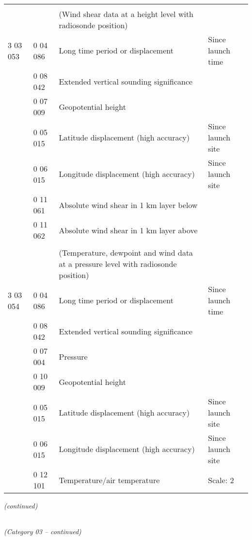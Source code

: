 \begin{longtable}[]{@{}llll@{}}
& & &\tabularnewline
& & (Wind shear data at a height level with radiosonde position) &\tabularnewline
3 03 053 & 0 04 086 & Long time period or displacement & Since launch time\tabularnewline
& 0 08 042 & Extended vertical sounding significance &\tabularnewline
& 0 07 009 & Geopotential height &\tabularnewline
& 0 05 015 & Latitude displacement (high accuracy) & Since launch site\tabularnewline
& 0 06 015 & Longitude displacement (high accuracy) & Since launch site\tabularnewline
& 0 11 061 & Absolute wind shear in 1 km layer below &\tabularnewline
& 0 11 062 & Absolute wind shear in 1 km layer above &\tabularnewline
& & &\tabularnewline
& & (Temperature, dewpoint and wind data at a pressure level with radiosonde position) &\tabularnewline
3 03 054 & 0 04 086 & Long time period or displacement & Since launch time\tabularnewline
& 0 08 042 & Extended vertical sounding significance &\tabularnewline
& 0 07 004 & Pressure &\tabularnewline
& 0 10 009 & Geopotential height &\tabularnewline
& 0 05 015 & Latitude displacement (high accuracy) & Since launch site\tabularnewline
& 0 06 015 & Longitude displacement (high accuracy) & Since launch site\tabularnewline
& 0 12 101 & Temperature/air temperature & Scale: 2\tabularnewline
\bottomrule
\end{longtable}

\emph{(continued)}

\emph{\\
(Category 03 -- continued)}

